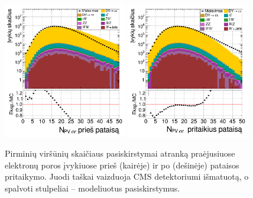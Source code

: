 \documentclass[a4paper, 12pt, twoside]{article}
\begin{document}
\begin{figure}[tbp]
	\includegraphics[width=0.48\textwidth]{nVTXee_before.png}
	\includegraphics[width=0.48\textwidth]{nVTXee_after.png}
	\caption{\label{fig:PUba} Pirminių viršūnių skaičiaus pasiskirstymai atranką praėjusiuose elektronų poros
		įvykiuose prieš (kairėje) ir po (dešinėje) pataisos pritaikymo.
		Juodi taškai vaizduoja CMS detektoriumi išmatuotą, o spalvoti stulpeliai -- modeliuotus pasiskirstymus.}
\end{figure}
\end{document}

